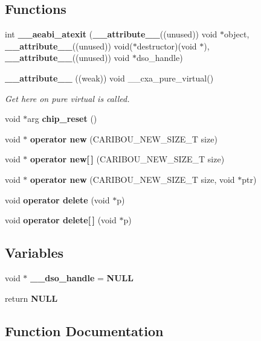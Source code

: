 \subsection*{Functions}
\begin{DoxyCompactItemize}
\item 
int {\bf \-\_\-\-\_\-aeabi\-\_\-atexit} ({\bf \-\_\-\-\_\-attribute\-\_\-\-\_\-}((unused)) void $\ast$object, {\bf \-\_\-\-\_\-attribute\-\_\-\-\_\-}((unused)) void($\ast$destructor)(void $\ast$), {\bf \-\_\-\-\_\-attribute\-\_\-\-\_\-}((unused)) void $\ast$dso\-\_\-handle)
\item 
{\bf \-\_\-\-\_\-attribute\-\_\-\-\_\-} ((weak)) void \-\_\-\-\_\-cxa\-\_\-pure\-\_\-virtual()
\begin{DoxyCompactList}\small\item\em Get here on pure virtual is called. \end{DoxyCompactList}\item 
void $\ast$arg {\bf chip\-\_\-reset} ()
\item 
void $\ast$ {\bf operator new} (C\-A\-R\-I\-B\-O\-U\-\_\-\-N\-E\-W\-\_\-\-S\-I\-Z\-E\-\_\-\-T size)
\item 
void $\ast$ {\bf operator new[$\,$]} (C\-A\-R\-I\-B\-O\-U\-\_\-\-N\-E\-W\-\_\-\-S\-I\-Z\-E\-\_\-\-T size)
\item 
void $\ast$ {\bf operator new} (C\-A\-R\-I\-B\-O\-U\-\_\-\-N\-E\-W\-\_\-\-S\-I\-Z\-E\-\_\-\-T size, void $\ast$ptr)
\item 
void {\bf operator delete} (void $\ast$p)
\item 
void {\bf operator delete[$\,$]} (void $\ast$p)
\end{DoxyCompactItemize}
\subsection*{Variables}
\begin{DoxyCompactItemize}
\item 
void $\ast$ {\bf \-\_\-\-\_\-dso\-\_\-handle} = {\bf N\-U\-L\-L}
\item 
return {\bf N\-U\-L\-L}
\end{DoxyCompactItemize}


\subsection{Function Documentation}
